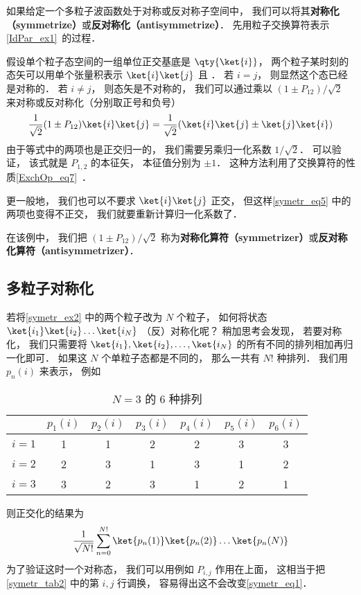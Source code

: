

如果给定一个多粒子波函数处于对称或反对称子空间中， 我们可以将其\textbf{对称化（symmetrize）}或\textbf{反对称化（antisymmetrize）}． 先用粒子交换算符表示\autoref{IdPar_ex1}~的过程．

\begin{example}{}\label{symetr_ex2}
假设单个粒子态空间的一组单位正交基底是 $\qty{\ket{i}}$， 两个粒子某时刻的态矢可以用单个张量积表示 $\ket{i}\ket{j}$ 且 ． 若 $i = j$， 则显然这个态已经是对称的．  若 $i \ne j$， 则态矢是不对称的， 我们可以通过乘以 $(1 \pm P_{12})/\sqrt{2}$ 来对称或反对称化（分别取正号和负号）
\begin{equation}\label{symetr_eq5}
\frac{1}{\sqrt{2}}(1 \pm P_{12})\ket{i}\ket{j} = \frac{1}{\sqrt{2}}(\ket{i}\ket{j} \pm \ket{j}\ket{i})
\end{equation}
由于等式中的两项也是正交归一的， 我们需要另乘归一化系数 $1/\sqrt 2$． 可以验证， 该式就是 $P_{1,2}$ 的本征矢， 本征值分别为 $\pm 1$． 这种方法利用了交换算符的性质\autoref{ExchOp_eq7}~．

更一般地， 我们也可以不要求 $\ket{i}\ket{j}$ 正交， 但这样\autoref{symetr_eq5} 中的两项也变得不正交， 我们就要重新计算归一化系数了．
\end{example}

在该例中， 我们把 $(1 \pm P_{12})/\sqrt{2}$ 称为\textbf{对称化算符（symmetrizer）}或\textbf{反对称化算符（antisymmetrizer）}．

\subsection{多粒子对称化}
若将\autoref{symetr_ex2} 中的两个粒子改为 $N$ 个粒子， 如何将状态 $\ket{i_1}\ket{i_2}\dots\ket{i_N}$ （反）对称化呢？ 稍加思考会发现， 若要对称化， 我们只需要将 $\ket{i_1},\ket{i_2},\dots,\ket{i_N}$ 的所有不同的排列相加再归一化即可． 如果这 $N$ 个单粒子态都是不同的， 那么一共有 $N!$ 种排列． 我们用 $p_n(i)$ 来表示， 例如
\begin{table}[ht]
\centering
\caption{$N = 3$ 的 6 种排列}\label{symetr_tab2}
\begin{tabular}{|c|c|c|c|c|c|c|}
\hline
  & $p_1(i)$ & $p_2(i)$ & $p_3(i)$ & $p_4(i)$ & $p_5(i)$ & $p_6(i)$ \\
\hline
$i=1$ & 1 & 1 & 2 & 2 & 3 & 3 \\
\hline
$i=2$ & 2 & 3 & 1 & 3 & 1 & 2 \\
\hline
$i=3$ & 3 & 2 & 3 & 1 & 2 & 1 \\
\hline
\end{tabular}
\end{table}
则正交化的结果为
\begin{equation}\label{symetr_eq1}
\frac{1}{\sqrt{N!}}\sum_{n = 0}^{N!} \ket{p_n(1)}\ket{p_n(2)}\dots\ket{p_n(N)}
\end{equation}
为了验证这时一个对称态， 我们可以用例如 $P_{i,j}$ 作用在上面， 这相当于把\autoref{symetr_tab2} 中的第 $i,j$ 行调换， 容易得出这不会改变\autoref{symetr_eq1}．

